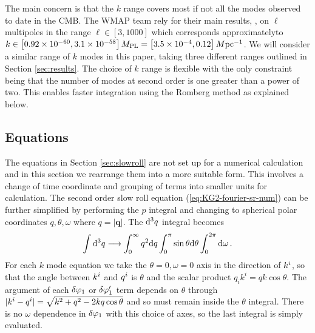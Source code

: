 The main concern is that the $k$ range covers most if not all the modes observed
to date in the CMB. The WMAP team rely for their main results,
\cite{Komatsu:2008hk},  
 on $\ell$ multipoles in the range $\ell \in [3, 1000]$
which corresponds approximately\footnotemark  to $k\in \left[0.92 \times 10^{-60}, 3.1 \times
10^{-58}\right]M_{\mathrm{PL}} = \left[3.5\times 10^{-4}, 0.12\right] M \mathrm{pc}^{-1}$.
We will consider a similar range of $k$ modes in this paper, taking three
different ranges outlined in Section \ref{sec:results}. The
choice of $k$ range is flexible with the only constraint being that the number
of modes at second order is one greater than a power of two. This enables faster
integration using the Romberg method as explained below. 




\subsection{Equations}
\label{sec:numeqs}


The equations in Section \ref{sec:slowroll} are not set up for a
numerical calculation and in this section we rearrange them into a more
suitable form. This involves a change of time coordinate and grouping of terms
into smaller units for calculation.
The second order slow roll equation (\ref{eq:KG2-fourier-sr-num}) can be further
simplified by performing the $p$
integral and changing to spherical polar coordinates $q, \theta, \omega$ where
$q=|\textbf{q}|$. The $\mathrm{d}^3q$ integral becomes
% 
\begin{equation}
 \int \mathrm{d}^3q \longrightarrow \int_{0}^{\infty} q^2 \mathrm{d} q \int_{0}^{\pi}\sin \theta
\mathrm{d}\theta 
   \int_{0}^{2\pi}\mathrm{d}\omega \,.
\end{equation}
% 
For each $k$ mode equation we take the $\theta=0, \omega=0$ axis in the
direction of $k^i$, so that the angle between $k^i$ and $q^i$ is
$\theta$ and the scalar product $q_i k^i = q k \cos\theta$. 
The argument of
each $\delta\varphi_{1}$ or $\delta\varphi_{1}'$ term depends on $\theta$ through
$|k^i-q^i|=\sqrt{k^2 + q^2 -2kq \cos\theta}$ and
so must remain inside the $\theta$ integral. There is no $\omega$ dependence
in $\delta\varphi_{1}$ with this choice of axes, so the last integral is simply evaluated.

